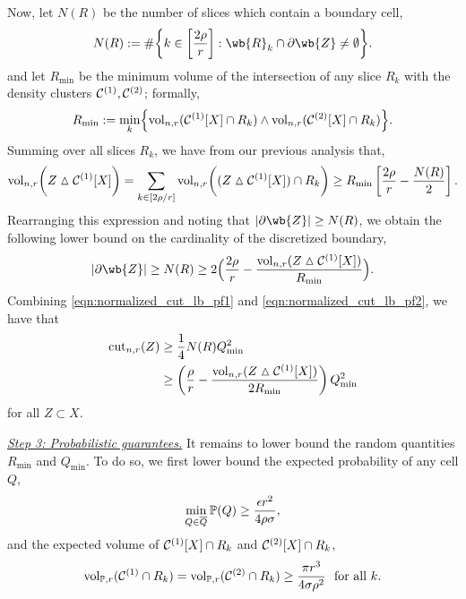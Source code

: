 	Now, let $N(R)$ be the number of slices which contain a boundary cell,
	\begin{equation*}
	N(R) := \#\biggl\{k \in \biggl[\frac{2\rho}{r}\biggr]: \wb{R}_k \cap \partial \wb{Z} \neq \emptyset\biggr\}.
	\end{equation*}
	and let $R_{\min}$ be the minimum volume of the intersection of any slice $R_k$ with the density clusters $\mathcal{C}^{(1)}, \mathcal{C}^{(2)}$; formally,
	\begin{equation}
	\label{eqn:normalized_cut_lb_pf1.5}
	R_{\min} := \min_{k}\Bigl\{\mathrm{vol}_{n,r}(\mathcal{C}^{(1)}[X] \cap R_k) \wedge \mathrm{vol}_{n,r}(\mathcal{C}^{(2)}[X] \cap R_k)\Bigr\}.
	\end{equation} 
	Summing over all slices $R_k$, we have from our previous analysis that,
	\begin{equation*}
	\mathrm{vol}_{n,r}\biggl(Z \vartriangle \mathcal{C}^{(1)}[X]\biggr) = \sum_{k \in [2\rho/r]} \mathrm{vol}_{n,r}\biggl( (Z \vartriangle \mathcal{C}^{(1)}[X]) \cap R_k\biggr) \geq R_{\min}  \left[\frac{2\rho}{r} - \frac{N(R)}{2}\right].
	\end{equation*}
	Rearranging this expression and noting that $\abs{\partial\wb{Z}} \geq N(R)$,  we obtain the following lower bound on the cardinality of the discretized boundary,
	\begin{equation}
	\label{eqn:normalized_cut_lb_pf2}
	\abs{\partial\wb{Z}} \geq N(R) \geq 2\Bigl(\frac{2\rho}{r} - \frac{\vol_{n,r}(Z \vartriangle \mc{C}^{(1)}[X])}{R_{\min}}\Bigr).
	\end{equation}
	Combining \eqref{eqn:normalized_cut_lb_pf1} and \eqref{eqn:normalized_cut_lb_pf2}, we have that
	\begin{align}
	\mathrm{cut}_{n,r}(Z) & \geq \frac{1}{4}N(R) Q_{\min}^2 \nonumber \\
	& \geq \left(\frac{\rho}{r} - \frac{\mathrm{vol}_{n,r}(Z \vartriangle \mathcal{C}^{(1)}[X])}{2R_{\min}}\right) Q_{\min}^2 \label{eqn:normalized_cut_lb_pf3}
	\end{align}
	for all $Z \subset X$.
	
	\emph{\underline{Step 3: Probabilistic guarantees.}}
	It remains to lower bound the random quantities $R_{\min}$ and $Q_{\min}$.
	To do so, we first lower bound the expected probability of any cell $Q$,
	\begin{equation}
	\label{eqn:normalized_cut_lb_pf4.5}
	\min_{Q \in \overline{Q}} \mathbb{P}(Q) \geq \frac{\epsilon r^2}{4 \rho \sigma},
	\end{equation}
	and the expected volume of $\mathcal{C}^{(1)}[X] \cap R_k$ and $\mathcal{C}^{(2)}[X] \cap R_k$,
	\begin{equation}
	\label{eqn:normalized_cut_lb_pf5}
	\mathrm{vol}_{\mathbb{P},r}(\mathcal{C}^{(1)} \cap R_k) = \mathrm{vol}_{\mathbb{P},r}(\mathcal{C}^{(2)} \cap R_k) \geq \frac{\pi r^3}{4 \sigma \rho^2}~~\textrm{for all $k$.} 
	\end{equation}
	
